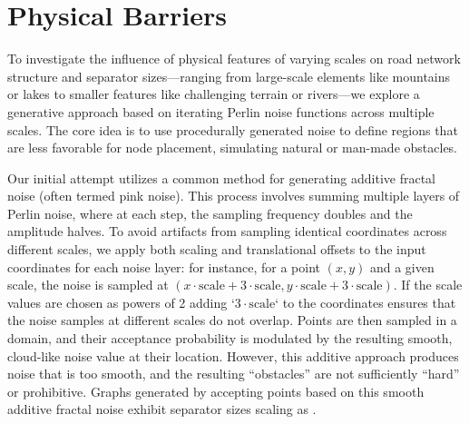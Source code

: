 



















\section{Physical Barriers}
\label{sec:synthetic:physical_barriers}

To investigate the influence of physical features of varying scales on road network structure and separator sizes—ranging from large-scale elements like mountains or lakes to smaller features like challenging terrain or rivers—we explore a generative approach based on iterating Perlin noise functions across multiple scales.
The core idea is to use procedurally generated noise to define regions that are less favorable for node placement, simulating natural or man-made obstacles.

Our initial attempt utilizes a common method for generating additive fractal noise (often termed pink noise).
This process involves summing multiple layers of Perlin noise, where at each step, the sampling frequency doubles and the amplitude halves.
To avoid artifacts from sampling identical coordinates across different scales, we apply both scaling and translational offsets to the input coordinates for each noise layer: for instance, for a point \((x,y)\) and a given scale, the noise is sampled at \((x \cdot \text{scale} + 3 \cdot \text{scale}, y \cdot \text{scale} + 3 \cdot \text{scale})\).
If the scale values are chosen as powers of 2 adding `\(3 \cdot \text{scale}\)` to the coordinates ensures that the noise samples at different scales do not overlap.
Points are then sampled in a domain, and their acceptance probability is modulated by the resulting smooth, cloud-like noise value at their location.
However, this additive approach produces noise that is too smooth, and the resulting \enquote{obstacles} are not sufficiently \enquote{hard} or prohibitive.
Graphs generated by accepting points based on this smooth additive fractal noise exhibit separator sizes scaling as .

